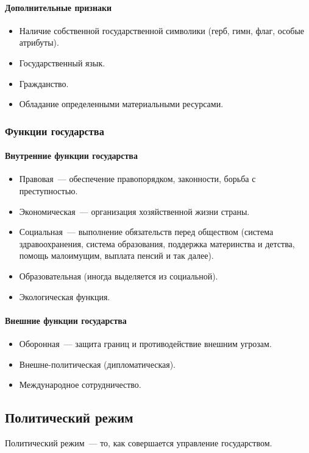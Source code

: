 \documentclass[12pt]{article}
\begin{document}
	\paragraph{Дополнительные признаки}
	\begin{itemize}
		\item Наличие собственной государственной символики (герб, гимн, флаг, особые атрибуты).
		\item Государственный язык.
		\item Гражданство.
		\item Обладание определенными материальными ресурсами.
	\end{itemize}
	\subsubsection{Функции государства}
	\paragraph{Внутренние функции государства}
	\begin{itemize}
		\item Правовая~--- обеспечение правопорядком, законности, борьба с преступностью.
		\item Экономическая~--- организация хозяйственной жизни страны.
		\item Социальная~--- выполнение обязательств перед обществом (система здравоохранения, система образования, поддержка материнства и детства, помощь малоимущим, выплата пенсий и так далее).
		\item Образовательная (иногда выделяется из социальной).
		\item Экологическая функция.
	\end{itemize}
	\paragraph{Внешние функции государства}
	\begin{itemize}
		\item Оборонная~--- защита границ и противодействие внешним угрозам.
		\item Внешне-политическая (дипломатическая).
		\item Международное сотрудничество.
	\end{itemize}
	\subsection{Политический режим}
	\begin{definition}
		Политический режим~--- то, как совершается управление государством.
	\end{definition}
\end{document}
